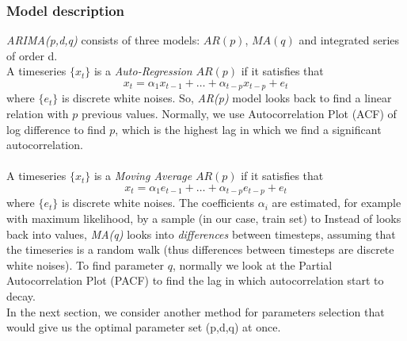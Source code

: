 \documentclass[11pt]{article}
\begin{document}
\subsubsection{Model description}
\textit{ARIMA(p,d,q)} consists of three models: $AR(p)$, $MA(q)$ and integrated
series of order d.\\ 
A timeseries $\{x_t\}$ is a \textit{Auto-Regression} $AR(p)$ if it satisfies that
$$
x_t = \alpha_1x_{t-1} + \ldots + \alpha_{t-p}x_{t-p} + e_t 
$$
where $\{e_t\}$ is discrete white noises. So, \textit{AR(p)} model looks back to
find a linear relation with $p$ previous values. Normally, we use
Autocorrelation Plot (ACF) of log difference to find $p$, which is the highest
lag in which we find a significant autocorrelation.\\
\\
A timeseries $\{x_t\}$ is a \textit{Moving Average} $AR(p)$ if it satisfies that
$$
x_t = \alpha_1e_{t-1} + \ldots + \alpha_{t-p}e_{t-p} + e_t 
$$
where $\{e_t\}$ is discrete white noises. The coefficients $\alpha_i$ are
estimated, for example with maximum likelihood, by a sample (in our case, train
set) to Instead of looks back into values, \textit{MA(q)} looks into
\textit{differences} between timesteps, assuming that the timeseries is a random
walk (thus differences between timesteps are discrete white noises). To find
parameter $q$, normally we look at the Partial Autocorrelation Plot (PACF) to
find the lag in which autocorrelation start to decay.\\
In the next section, we consider another method for parameters selection that
would give us the optimal parameter set (p,d,q) at once.
\end{document}

